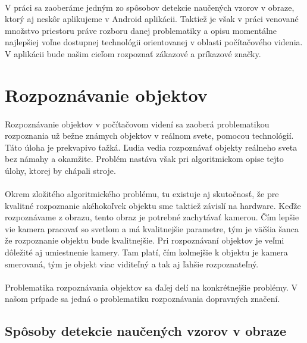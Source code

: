 \documentclass[12pt]{article}
\begin{document}
\paragraph{}
V práci sa zaoberáme jedným zo spôsobov detekcie naučených vzorov v obraze, ktorý aj neskôr aplikujeme v Android aplikácii. Taktiež je však v práci venované množstvo priestoru práve rozboru danej problematiky a opisu momentálne najlepšiej voľne dostupnej technológii orientovanej v oblasti počítačového videnia. V aplikácii bude našim cieľom rozpoznať zákazové a príkazové značky.
\clearpage
\section{Rozpoznávanie objektov}
\paragraph{}
Rozpoznávanie objektov v počítačovom videní sa zaoberá problematikou rozpoznania už bežne známych objektov v reálnom svete, pomocou technológií.
Táto úloha je prekvapivo ťažká. Ľudia vedia rozpoznávať objekty reálneho sveta bez námahy a okamžite. Problém nastáva však pri algoritmickom opise tejto úlohy, ktorej by chápali stroje.
\cite{machine_vission}
\paragraph{}
Okrem zložitého algoritmického problému, tu existuje aj skutočnosť, že pre kvalitné rozpoznanie akéhokoľvek objektu sme taktiež závislí na hardware.
Keďže rozpoznávame z obrazu, tento obraz je potrebné zachytávať kamerou. Čím lepšie vie kamera pracovať so svetlom a má kvalitnejšie parametre, tým je väčšia šanca že rozpoznanie objektu bude kvalitnejšie.
Pri rozpoznávaní objektov je veľmi dôležité aj umiestnenie kamery. Tam platí, čím kolmejšie k objektu je kamera smerovaná, tým je objekt viac viditeľný a tak aj ľahšie rozpoznateľný. 
\cite{machine_vission}
\paragraph{}
Problematika rozpoznávania objektov sa ďaľej delí na konkrétnejšie problémy. V našom prípade sa jedná o problematiku rozpoznávania dopravných značení.
\cite{machine_vission}
\subsection{Spôsoby detekcie naučených vzorov v obraze}
\end{document}
